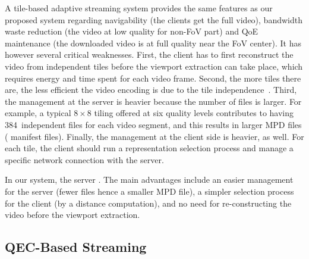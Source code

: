 A tile-based adaptive streaming system provides the same features as
our proposed system regarding navigability (the clients get the full
video), bandwidth waste reduction (the video at low quality for
non-\ac{FoV} part) and \ac{QoE} maintenance (the downloaded video is
at full quality near the \ac{FoV} center). It has however several
critical weaknesses. First, the client has to first reconstruct the
video from independent tiles before the viewport extraction can take
place, which requires energy and time spent for each video frame.
Second, the more tiles there are, the less efficient the video
encoding is due to the tile
independence~\cite{sanchez_compressed_2015}. Third, the management at
the server is heavier because the number of files is larger. For
example, a typical $8\times8$ tiling offered at six quality levels
contributes to having 384~independent files for each video segment,
and this results in larger \ac{MPD} files ( manifest
files). Finally, the management at the client side is heavier, as
well. For each tile, the client should run a representation selection
process and manage a specific network connection with the server.

In our system, the server
.
The main advantages include
an easier management for the server (fewer files hence a smaller
\ac{MPD} file), a simpler selection process for the client (by a
distance computation), and no need for re-constructing the video before
the viewport extraction.

\subsection{QEC-Based Streaming}

